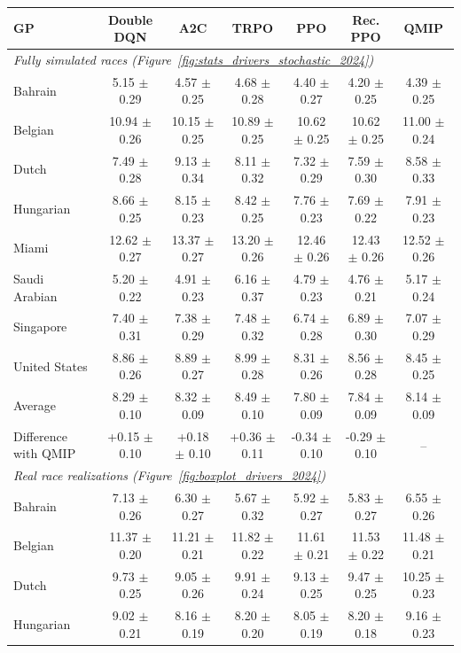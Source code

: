 \begin{tabular}{lcccccc}
\toprule
GP & Double DQN & A2C & TRPO & PPO & Rec. PPO & QMIP \\
\midrule
\multicolumn{7}{l}{\textit{Fully simulated races (Figure~\ref{fig:stats_drivers_stochastic_2024})}} \\
\midrule
Bahrain & 5.15 $\pm$ 0.29 & 4.57 $\pm$ 0.25 & 4.68 $\pm$ 0.28 & 4.40 $\pm$ 0.27 & 4.20 $\pm$ 0.25 & 4.39 $\pm$ 0.25 \\
Belgian & 10.94 $\pm$ 0.26 & 10.15 $\pm$ 0.25 & 10.89 $\pm$ 0.25 & 10.62 $\pm$ 0.25 & 10.62 $\pm$ 0.25 & 11.00 $\pm$ 0.24 \\
Dutch & 7.49 $\pm$ 0.28 & 9.13 $\pm$ 0.34 & 8.11 $\pm$ 0.32 & 7.32 $\pm$ 0.29 & 7.59 $\pm$ 0.30 & 8.58 $\pm$ 0.33 \\
Hungarian & 8.66 $\pm$ 0.25 & 8.15 $\pm$ 0.23 & 8.42 $\pm$ 0.25 & 7.76 $\pm$ 0.23 & 7.69 $\pm$ 0.22 & 7.91 $\pm$ 0.23 \\
Miami & 12.62 $\pm$ 0.27 & 13.37 $\pm$ 0.27 & 13.20 $\pm$ 0.26 & 12.46 $\pm$ 0.26 & 12.43 $\pm$ 0.26 & 12.52 $\pm$ 0.26 \\
Saudi Arabian & 5.20 $\pm$ 0.22 & 4.91 $\pm$ 0.23 & 6.16 $\pm$ 0.37 & 4.79 $\pm$ 0.23 & 4.76 $\pm$ 0.21 & 5.17 $\pm$ 0.24 \\
Singapore & 7.40 $\pm$ 0.31 & 7.38 $\pm$ 0.29 & 7.48 $\pm$ 0.32 & 6.74 $\pm$ 0.28 & 6.89 $\pm$ 0.30 & 7.07 $\pm$ 0.29 \\
United States & 8.86 $\pm$ 0.26 & 8.89 $\pm$ 0.27 & 8.99 $\pm$ 0.28 & 8.31 $\pm$ 0.26 & 8.56 $\pm$ 0.28 & 8.45 $\pm$ 0.25 \\
\midrule
Average & 8.29 $\pm$ 0.10 & 8.32 $\pm$ 0.09 & 8.49 $\pm$ 0.10 & 7.80 $\pm$ 0.09 & 7.84 $\pm$ 0.09 & 8.14 $\pm$ 0.09 \\
Difference with QMIP & +0.15 $\pm$ 0.10 & +0.18 $\pm$ 0.10 & +0.36 $\pm$ 0.11 & -0.34 $\pm$ 0.10 & -0.29 $\pm$ 0.10 & -- \\
\midrule
\multicolumn{7}{l}{\textit{Real race realizations (Figure~\ref{fig:boxplot_drivers_2024})}} \\
\midrule
Bahrain & 7.13 $\pm$ 0.26 & 6.30 $\pm$ 0.27 & 5.67 $\pm$ 0.32 & 5.92 $\pm$ 0.27 & 5.83 $\pm$ 0.27 & 6.55 $\pm$ 0.26 \\
Belgian & 11.37 $\pm$ 0.20 & 11.21 $\pm$ 0.21 & 11.82 $\pm$ 0.22 & 11.61 $\pm$ 0.21 & 11.53 $\pm$ 0.22 & 11.48 $\pm$ 0.21 \\
Dutch & 9.73 $\pm$ 0.25 & 9.05 $\pm$ 0.26 & 9.91 $\pm$ 0.24 & 9.13 $\pm$ 0.25 & 9.47 $\pm$ 0.25 & 10.25 $\pm$ 0.23 \\
Hungarian & 9.02 $\pm$ 0.21 & 8.16 $\pm$ 0.19 & 8.20 $\pm$ 0.20 & 8.05 $\pm$ 0.19 & 8.20 $\pm$ 0.18 & 9.16 $\pm$ 0.23 \\

\end{tabular}
